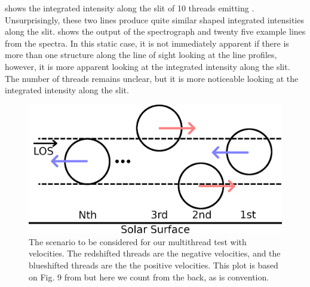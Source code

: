  shows the integrated intensity along the slit of 10 threads emitting \mgiihk{}. Unsurprisingly, these two lines produce quite similar shaped integrated intensities along the slit.  shows the output of the spectrograph and twenty five example lines from the spectra. In this static case, it is not immediately apparent if there is more than one structure along the line of sight looking at the line profiles, however, it is more apparent looking at the integrated intensity along the slit. The number of threads remains unclear, but it is more noticeable looking at the integrated intensity along the slit.  


\begin{figure}
    \centering
    \includegraphics*[width=0.8\linewidth]{./03Modelling2D/figs/lr2016_3_vels.png}
    \caption[The scenario to be considered for our multithread test with velocities.]{The scenario to be considered for our multithread test with velocities. The redshifted threads are the negative velocities, and the blueshifted threads are the the positive velocities. This plot is based on Fig. 9 from \cite{labrosse_radiative_2016} but here we count from the back, as is convention.}
    \label{lr163v}
\end{figure}
